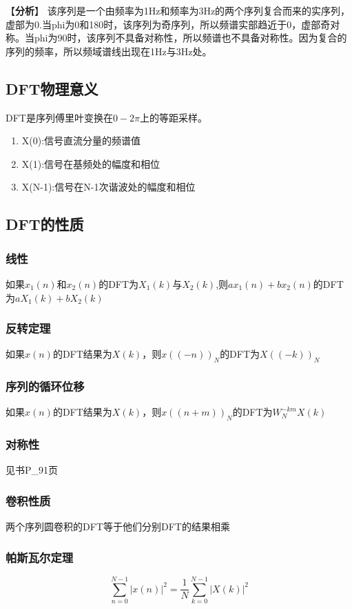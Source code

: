 \documentclass{../source/zjureport}
\begin{document}
                【\textbf{分析}】
                该序列是一个由频率为1Hz和频率为3Hz的两个序列复合而来的实序列，虚部为0.当phi为0和180时，该序列为奇序列，所以频谱实部趋近于0，虚部奇对称。当phi为90时，该序列不具备对称性，所以频谱也不具备对称性。因为复合的序列的频率，所以频域谱线出现在1Hz与3Hz处。

        \subsection{DFT物理意义}
            DFT是序列傅里叶变换在$0-2\pi$上的等距采样。
            \begin{enumerate}
                \item X(0):信号直流分量的频谱值
                \item X(1):信号在基频处的幅度和相位
                \item X(N-1):信号在N-1次谐波处的幅度和相位
            \end{enumerate}

        \subsection{DFT的性质}
            \subsubsection{线性}
            如果$x_1(n)$和$x_2(n)$的DFT为$X_1(k)$与$X_2(k)$,则$ax_1(n)+bx_2(n)$的DFT为$aX_1(k)+bX_2(k)$
            \subsubsection{反转定理}
            如果$x(n)$的DFT结果为$X(k)$，则$x((-n))_N$的DFT为$X((-k))_N$
            \subsubsection{序列的循环位移}
            如果$x(n)$的DFT结果为$X(k)$，则$x((n+m))_N$的DFT为$W_N^{-km}X(k)$
            \subsubsection{对称性}
            见书P_91页
            \subsubsection{卷积性质}
            两个序列圆卷积的DFT等于他们分别DFT的结果相乘
            \subsubsection{帕斯瓦尔定理}
            $$\sum_{n=0}^{N-1}|x(n)|^2 = \frac{1}{N}\sum_{k=0}^{N-1}|X(k)|^2$$

        
            
            



    
\end{document}
